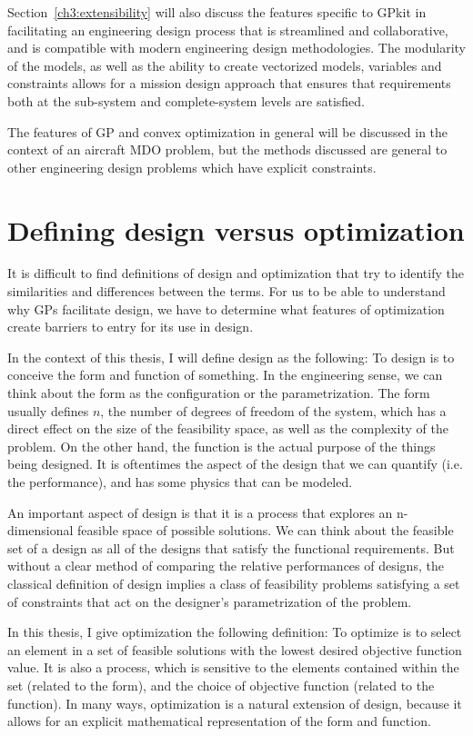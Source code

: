 Section~\ref{ch3:extensibility} will also discuss the features specific to
GPkit in facilitating
an engineering design process that is streamlined and collaborative, and is
compatible with modern engineering design methodologies. The modularity of the
models, as well as the ability to create vectorized models, variables and constraints
allows for a mission design approach that ensures that
requirements both at the sub-system and complete-system levels are satisfied.

The features of \gls{GP} and convex optimization in general will be discussed in
the context of an aircraft \gls{MDO} problem, but the methods discussed
are general to other engineering design problems which have explicit constraints.

\section{Defining design versus optimization} \label{s:DesVsOpt}

It is difficult to find definitions of design and optimization that
try to identify the similarities and differences between the terms. For us to be
able to understand why \gls{GP}s facilitate design, we have to determine what
features of optimization create barriers to entry for its use in design.

In the context of this thesis, I will define design as the following:
To design is to conceive the form and function of something.
In the engineering sense, we can think about the form as the configuration or
the parametrization. The form usually defines $n$, the number of degrees of freedom
of the system, which has a direct effect on the size of the feasibility
space, as well as the complexity of the problem.
On the other hand, the function is the actual purpose of the things
being designed. It is oftentimes the aspect of the design that we can
quantify (i.e. the performance), and has some physics that can be modeled.

An important aspect of design is that it is a process that explores an
n-dimensional feasible space of possible solutions.
We can think about the feasible set of a design as all of the designs
that satisfy the functional requirements. But without a clear method of comparing
the relative performances of designs, the classical
definition of design implies a class of feasibility problems satisfying a set of
constraints that act on the designer's parametrization of the problem.

In this thesis, I give optimization the following definition: To optimize is to select an
element in a set of feasible solutions with the lowest desired objective
function value. It is also a process, which is sensitive to the elements contained within the set
(related to the form), and the choice of objective function (related to the
function).
In many ways, optimization is a natural extension of design, because it allows
for an explicit mathematical representation of the form and function.

